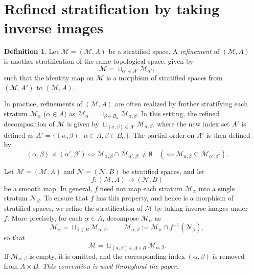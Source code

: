 \documentclass[12pt]{amsart}
\theoremstyle{definition}
\newtheorem{definition}[theorem]{Definition}
\numberwithin{equation}{section}
\newcommand{\partialless}{\preccurlyeq}
\begin{document}
{\section{Refined stratification by taking inverse images} \label{Apd:refinebyinverseimage} 
\begin{definition}
  Let $\mathcal{M}=(\mathcal{M},{A})$ be a stratified space. A \emph{refinement} of $(\mathcal{M},{A})$ is another stratification of the same topological space, given by
  $$\mathcal{M}=\sqcup_{\alpha'\in A'} \mathcal{M}_{\alpha'},$$
  such that the identity map on $\mathcal{M}$ is a morphism of stratified spaces from $(\mathcal{M},A')$ to $(\mathcal{M},A)$.
\end{definition}
In practice, refinements of $(\mathcal{M},{A})$ are often realized by further stratifying each stratum $\mathcal{M}_{\alpha}$ ($\alpha\in A$) as $\mathcal{M}_{\alpha}=\sqcup_{\beta\in B_\alpha} \mathcal{M}_{\alpha,\beta}$. In this setting, the refined decomposition of $\mathcal{M}$ is given by $\sqcup_{(\alpha,\beta)\in A' } \mathcal{M}_{\alpha,\beta}$, where the new index set $A'$ is defined as $A' =\{(\alpha,\beta):~\alpha\in A,\beta\in B_{\alpha}\}$. The partial order on $A'$ is then defined by
     $$(\alpha,\beta)\partialless (\alpha',\beta') \Leftrightarrow \mathcal{M}_{\alpha,\beta}\cap \overline{\mathcal{M}}_{\alpha',\beta'}\neq \emptyset \quad (\Leftrightarrow \mathcal{M}_{\alpha,\beta}\subseteq \overline{\mathcal{M}}_{\alpha',\beta'}).
     $$

Let \(\mathcal{M}=(\mathcal{M},A)\) and \(\mathcal{N}=(\mathcal{N},B)\) be stratified spaces, and let
\[
f:(\mathcal{M},A)\to(\mathcal{N},B)
\]
be a smooth map. In general, \(f\) need not map each stratum \(\mathcal{M}_{\alpha}\) into a single stratum \(\mathcal{N}_{\beta}\). To ensure that \(f\) has this property, and hence is a morphism of stratified spaces, we refine the stratification of \(\mathcal{M}\) by taking inverse images under \(f\). More precisely, for each \(\alpha\in A\), decompose \(\mathcal{M}_{\alpha}\) as
\[
\mathcal{M}_{\alpha}
=\sqcup_{\beta\in B}\mathcal{M}_{\alpha,\beta},
\qquad
\mathcal{M}_{\alpha,\beta}
:=\mathcal{M}_{\alpha}\cap f^{-1}(\mathcal{N}_{\beta}),
\]
so that
\begin{equation}\label{Eqt:MdecomposedtoAtimesB}
   \mathcal{M}=\sqcup_{(\alpha,\beta)\in A\times B}\mathcal{M}_{\alpha,\beta}.
\end{equation}
If \(\mathcal{M}_{\alpha,\beta}\) is empty, it is omitted, and the corresponding index \((\alpha,\beta)\) is removed from \(A\times B\). \emph{This convention is used throughout the paper.}
  
}
\end{document}
